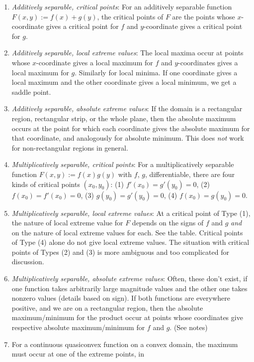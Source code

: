 \documentclass[10pt]{amsart}
\begin{document}
\begin{enumerate}
\item {\em Additively separable, critical points}: For an additively
  separable function $F(x,y) := f(x) + g(y)$, the critical points of
  $F$ are the points whose $x$-coordinate gives a critical point for
  $f$ and $y$-coordinate gives a critical point for $g$.
\item {\em Additively separable, local extreme values}: The local
  maxima occur at points whose $x$-coordinate gives a local maximum
  for $f$ and $y$-coordinates gives a local maximum for $g$. Similarly
  for local minima. If one coordinate gives a local maximum and the
  other coordinate gives a local minimum, we get a saddle point.
\item {\em Additively separable, absolute extreme values}: If the
  domain is a rectangular region, rectangular strip, or the whole
  plane, then the absolute maximum occurs at the point for which each
  coordinate gives the absolute maximum for that coordinate, and
  analogously for absolute minimum. This does {\em not} work for
  non-rectangular regions in general.
\item {\em Multiplicatively separable, critical points}: For a
  multiplicatively separable function $F(x,y) := f(x)g(y)$ with $f$,
  $g$, differentiable, there are four kinds of critical points
  $(x_0,y_0)$: (1) $f'(x_0) = g'(y_0) = 0$, (2) $f(x_0) = f'(x_0) =
  0$, (3) $g(y_0) = g'(y_0) = 0$, (4) $f(x_0) = g(y_0) = 0$.
\item {\em Multiplicatively separable, local extreme values}: At a
  critical point of Type (1), the nature of local extreme value for
  $F$ depends on the signs of $f$ and $g$ {\em and} on the nature of
  local extreme values for each. See the table. Critical points of
  Type (4) alone do not give local extreme values. The situation with
  critical points of Types (2) and (3) is more ambiguous and too
  complicated for discussion.
\item {\em Multiplicatively separable, absolute extreme values}:
  Often, these don't exist, if one function takes arbitrarily large
  magnitude values and the other one takes nonzero values (details
  based on sign). If both functions are everywhere positive, and we
  are on a rectangular region, then the absolute maximum/minimum for
  the product occur at points whose coordinates give respective
  absolute maximum/minimum for $f$ and $g$. (See notes)
\item For a continuous quasiconvex function on a convex domain, the
  maximum must occur at one of the extreme points, in

\end{enumerate}
\end{document}

